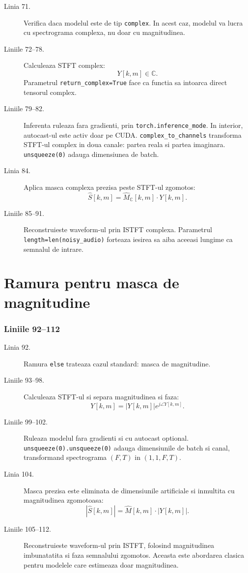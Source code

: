 \documentclass[12pt,a4paper]{report}
\newcommand{\codechunk}[2]{%
\subsection*{Liniile #1--#2}

}
\begin{document}
\begin{description}
    \item[Linia 71.] Verifica daca modelul este de tip \texttt{complex}. In acest
    caz, modelul va lucra cu spectrograma complexa, nu doar cu magnitudinea.

    \item[Liniile 72--78.] Calculeaza STFT complex:
    \[
    Y[k,m] \in \mathbb{C}.
    \]
    Parametrul \texttt{return\_complex=True} face ca functia sa intoarca direct
    tensorul complex.

    \item[Liniile 79--82.] Inferenta ruleaza fara gradienti, prin
    \texttt{torch.inference\_mode}. In interior, autocast-ul este activ doar pe
    CUDA. \texttt{complex\_to\_channels} transforma STFT-ul complex in doua canale:
    partea reala si partea imaginara. \texttt{unsqueeze(0)} adauga dimensiunea de
    batch.

    \item[Linia 84.] Aplica masca complexa prezisa peste STFT-ul zgomotos:
    \[
    \hat{S}[k,m] = \hat{M}_{\mathbb{C}}[k,m] \cdot Y[k,m].
    \]

    \item[Liniile 85--91.] Reconstruieste waveform-ul prin ISTFT complexa. Parametrul
    \texttt{length=len(noisy\_audio)} forteaza iesirea sa aiba aceeasi lungime ca
    semnalul de intrare.
\end{description}

\chapter{Ramura pentru masca de magnitudine}

\codechunk{92}{112}

\begin{description}
    \item[Linia 92.] Ramura \texttt{else} trateaza cazul standard: masca de magnitudine.

    \item[Liniile 93--98.] Calculeaza STFT-ul si separa magnitudinea si faza:
    \[
    Y[k,m] = |Y[k,m]| e^{j\angle Y[k,m]}.
    \]

    \item[Liniile 99--102.] Ruleaza modelul fara gradienti si cu autocast optional.
    \texttt{unsqueeze(0).unsqueeze(0)} adauga dimensiunile de batch si canal,
    transformand spectrograma \((F,T)\) in \((1,1,F,T)\).

    \item[Linia 104.] Masca prezisa este eliminata de dimensiunile artificiale si
    inmultita cu magnitudinea zgomotoasa:
    \[
    |\hat{S}[k,m]| = \hat{M}[k,m] \cdot |Y[k,m]|.
    \]

    \item[Liniile 105--112.] Reconstruieste waveform-ul prin ISTFT, folosind
    magnitudinea imbunatatita si faza semnalului zgomotos. Aceasta este abordarea
    clasica pentru modelele care estimeaza doar magnitudinea.
\end{description}
\end{document}
